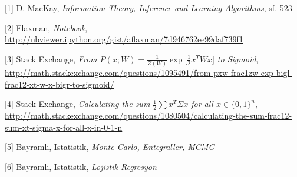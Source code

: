 \documentclass[12pt,fleqn]{article}\usepackage{../../common}
\begin{document}
[1] D. MacKay, {\em Information Theory, Inference and Learning Algorithms}, sf. 523

[2] Flaxman, {\em Notebook}, \url{http://nbviewer.ipython.org/gist/aflaxman/7d946762ee99daf739f1}

[3] Stack Exchange, {\em From $P(x;W) = \frac{1}{Z(W)} \exp \bigl[ \frac{1}{2} x^T W x
  \bigr]$ to Sigmoid}, \url{http://math.stackexchange.com/questions/1095491/from-pxw-frac1zw-exp-bigl-frac12-xt-w-x-bigr-to-sigmoid/}

[4] Stack Exchange, {\em Calculating the sum $\frac{1}{2} \sum x^T \Sigma x$ for all $x \in
  \{0,1\}^n$}, \url{http://math.stackexchange.com/questions/1080504/calculating-the-sum-frac12-sum-xt-sigma-x-for-all-x-in-0-1-n}

[5] Bayramlı, Istatistik, {\em Monte Carlo, Entegraller, MCMC}

[6] Bayramlı, Istatistik, {\em Lojistik Regresyon}
\end{document}
